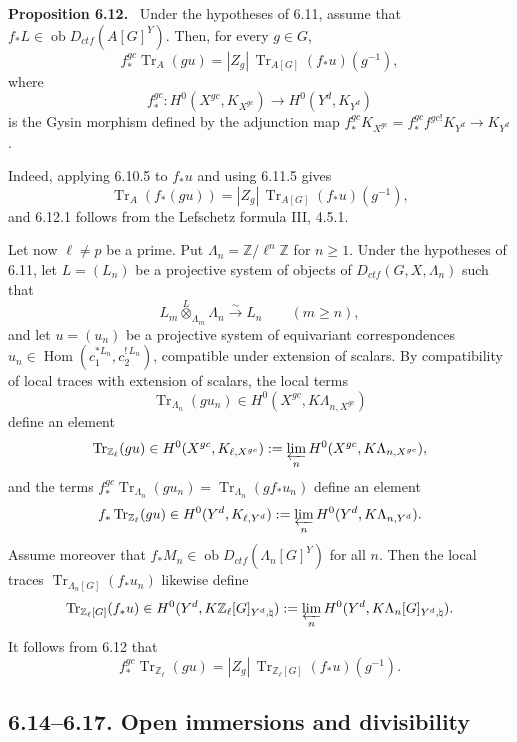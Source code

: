 \documentclass[12pt]{article}
\newcommand{\bZ}{\mathbb Z}
\newcommand{\Hom}{\operatorname{Hom}}
\newcommand{\Tr}{\operatorname{Tr}}
\newcommand{\ob}{\operatorname{ob}}
\newenvironment{statement}[1]{\par\medskip\noindent\textbf{#1.}\ }{\par\medskip}
\begin{document}
\begin{statement}{Proposition 6.12}
Under the hypotheses of 6.11, assume that
$f_*L\in\ob D_{ctf}(A[G]^Y)$. Then, for every $g\in G$,
\begin{equation}\tag{6.12.1}
 f_*^{gc}\Tr_A(gu)=|Z_g|\,\Tr_{A[G]}(f_*u)(g^{-1}),
\end{equation}
where
\[
      f_*^{gc}:H^0(X^{gc},K_{X^{gc}})\longrightarrow H^0(Y^d,K_{Y^d})
\]
is the Gysin morphism defined by the adjunction map
$f_*^{gc}K_{X^{gc}}=f_*^{gc}f^{gc!}K_{Y^d}\to K_{Y^d}$.
\end{statement}

Indeed, applying 6.10.5 to $f_*u$ and using 6.11.5 gives
\[
     \Tr_A(f_*(gu))=|Z_g|\,\Tr_{A[G]}(f_*u)(g^{-1}),
\]
and 6.12.1 follows from the Lefschetz formula III, 4.5.1.

Let now $\ell\ne p$ be a prime. Put $\Lambda_n=\bZ/\ell^n\bZ$ for $n\ge1$.
Under the hypotheses of 6.11, let $L=(L_n)$ be a projective system of objects of
$D_{ctf}(G,X,\Lambda_n)$ such that
\[
      L_m\overset{L}{\otimes}_{\Lambda_m}\Lambda_n\xrightarrow{\sim}L_n
      \qquad (m\ge n),
\]
and let $u=(u_n)$ be a projective system of equivariant correspondences
$u_n\in\Hom(c_1^{*L_n},c_2^{!\,L_n})$, compatible under extension of scalars. By
compatibility of local traces with extension of scalars, the local terms
\[
      \Tr_{\Lambda_n}(gu_n)\in H^0(X^{gc},K\Lambda_{n,X^{gc}})
\]
define an element
\[
      \Tr_{\bZ_\ell}(gu)\in H^0(X^{gc},K_{\ell,X^{gc}})
      :=\varprojlim_n H^0(X^{gc},K\Lambda_{n,X^{gc}}),
\]
and the terms $f_*^{gc}\Tr_{\Lambda_n}(gu_n)=\Tr_{\Lambda_n}(g f_*u_n)$ define an
element
\[
      f_*\Tr_{\bZ_\ell}(gu)\in H^0(Y^d,K_{\ell,Y^d})
      :=\varprojlim_n H^0(Y^d,K\Lambda_{n,Y^d}).
\]
Assume moreover that $f_*M_n\in\ob D_{ctf}(\Lambda_n[G]^Y)$ for all $n$. Then the
local traces $\Tr_{\Lambda_n[G]}(f_*u_n)$ likewise define
\[
      \Tr_{\bZ_\ell[G]}(f_*u)
      \in H^0(Y^d,K\bZ_\ell[G]_{Y^d,\natural})
      :=\varprojlim_n H^0(Y^d,K\Lambda_n[G]_{Y^d,\natural}).
\]
It follows from 6.12 that
\begin{equation}\tag{6.13.1}
      f_*^{gc}\Tr_{\bZ_\ell}(gu)
      =|Z_g|\,\Tr_{\bZ_\ell[G]}(f_*u)(g^{-1}).
\end{equation}

\subsection*{6.14--6.17. Open immersions and divisibility}
\end{document}
